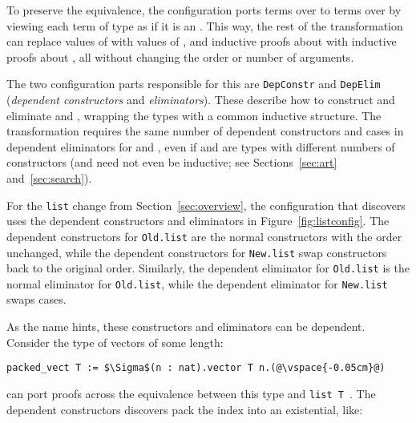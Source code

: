 
To preserve the equivalence, the configuration ports terms over \A to terms over \B by viewing each
term of type \B as if it is an \A.
This way, the rest of the transformation can replace values of \A with values of \B, and
inductive proofs about \A with inductive proofs about \B, %
all without changing the order or number of arguments.

The two configuration parts responsible for this are \lstinline{DepConstr}
and \lstinline{DepElim} (\textit{dependent constructors} and \textit{eliminators}).
These describe how to construct and eliminate \A and \B, wrapping the types with a common inductive structure.
The transformation requires the same number of dependent constructors and cases in dependent eliminators for \A and \B,
even if \A and \B are types with different numbers of constructors
(\A and \B need not even be inductive; see Sections~\ref{sec:art} and~\ref{sec:search}).

For the \lstinline{list} change from Section~\ref{sec:overview},
the configuration that \toolname discovers uses the dependent constructors
and eliminators in Figure~\ref{fig:listconfig}. The dependent constructors for \lstinline{Old.list}
are the normal constructors with the order unchanged,
while the dependent constructors for \lstinline{New.list} swap constructors
back to the original order.
Similarly, the dependent eliminator for \lstinline{Old.list} is the normal eliminator for \lstinline{Old.list},
while the dependent eliminator for \lstinline{New.list} swaps cases.

As the name hints, these constructors and eliminators can be dependent.
Consider the type of vectors of some length:

\begin{lstlisting}
packed_vect T := $\Sigma$(n : nat).vector T n.(@\vspace{-0.05cm}@)
\end{lstlisting}
\toolname can port proofs across the equivalence between this type and \lstinline{list T}~\href{https://github.com/uwplse/pumpkin-pi/blob/silent/plugin/coq/examples/Example.v}{}. %
The dependent constructors \toolname discovers pack the index into an existential, like:

